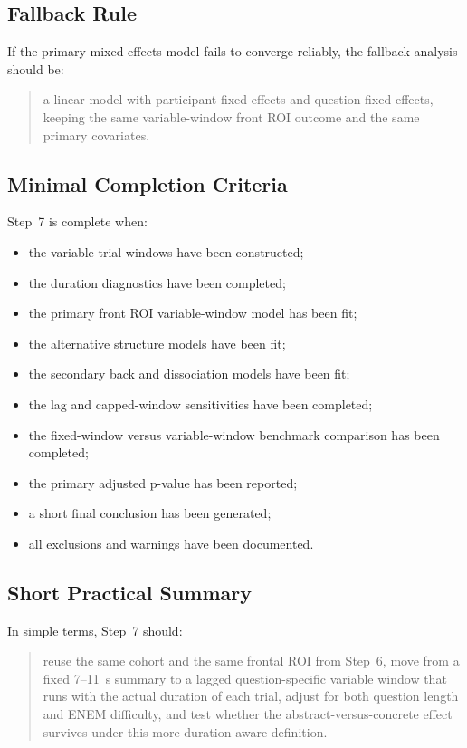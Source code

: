\subsection{Fallback Rule}
If the primary mixed-effects model fails to converge reliably, the fallback analysis should be:
\begin{quote}
a linear model with participant fixed effects and question fixed effects, keeping the same
variable-window front ROI outcome and the same primary covariates.
\end{quote}

\subsection{Minimal Completion Criteria}
Step~7 is complete when:
\begin{itemize}
    \item the variable trial windows have been constructed;
    \item the duration diagnostics have been completed;
    \item the primary front ROI variable-window model has been fit;
    \item the alternative structure models have been fit;
    \item the secondary back and dissociation models have been fit;
    \item the lag and capped-window sensitivities have been completed;
    \item the fixed-window versus variable-window benchmark comparison has been completed;
    \item the primary adjusted p-value has been reported;
    \item a short final conclusion has been generated;
    \item all exclusions and warnings have been documented.
\end{itemize}

\subsection{Short Practical Summary}
In simple terms, Step~7 should:
\begin{quote}
reuse the same cohort and the same frontal ROI from Step~6, move from a fixed 7--11~s summary
to a lagged question-specific variable window that runs with the actual duration of each trial,
adjust for both question length and ENEM difficulty, and test whether the abstract-versus-concrete
effect survives under this more duration-aware definition.
\end{quote}